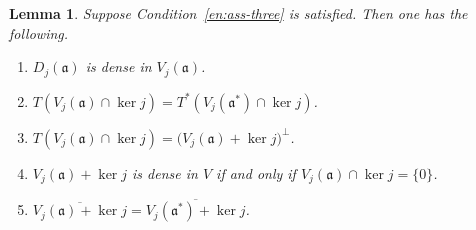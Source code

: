 \documentclass[a4paper,oneside,12pt]{amsart}
\theoremstyle{plain}
\newtheorem{lemma}[theorem]{Lemma}
\theoremstyle{definition}
\begin{document}
\begin{lemma}\label{lem:cond3}
Suppose Condition~\ref{en:ass-three} is satisfied. Then one has the following.
\begin{enumerate}[\upshape (a)]
\item\label{en:c3:denseVa} $D_j({{\mathfrak{{a}}}})$ is dense in $V_j({{\mathfrak{{a}}}})$.
\item\label{en:c3:idTTs} $T(V_j({{\mathfrak{{a}}}})\cap\ker j) = T^*(V_j({{\mathfrak{{a}}}}^*)\cap\ker j)$.
\item\label{en:c3:ident} $T(V_j({{\mathfrak{{a}}}})\cap\ker j)=\bigl(V_j({{\mathfrak{{a}}}})+\ker j\bigr)^\perp$.
\item\label{en:c3:denseV} $V_j({{\mathfrak{{a}}}})+\ker j$ is dense in $V$ if and only if $V_j({{\mathfrak{{a}}}})\cap\ker j=\{0\}$.
\item\label{en:c3:VaVas} ${\overline{{V_j({{\mathfrak{{a}}}})+\ker j}}}={\overline{{V_j({{\mathfrak{{a}}}}^*)+\ker j}}}$.
\end{enumerate}
\end{lemma}
\end{document}
